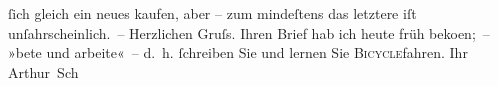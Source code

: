 \begin{ledgroupsized}[t]{13cm}
               ſich gleich ein neues kaufen, aber – zum mindeſtens das letztere {\pb}iſt unſahrscheinlich. –\pend
           \pstart
           Herzlichen Gruſs. Ihren Brief hab ich heute früh beko{\geminationm}en; – »bete und
               arbeite« – d. h. ſchreiben Sie und lernen Sie \textsc{Bicycle}fahren.\pend
           \pstart Ihr \spacefill\mbox{Arthur Sch}\pend{}          \endnumbering{}\end{ledgroupsized}  \newcommand{\dateiname}{L00801}\newcommand{\titel}{Arthur Schnitzler an Richard Beer-Hofmann, 4. 6. 1898}\newcommand{\editorInnen}{Martin Anton Müller und Gerd-Hermann Susen}
      